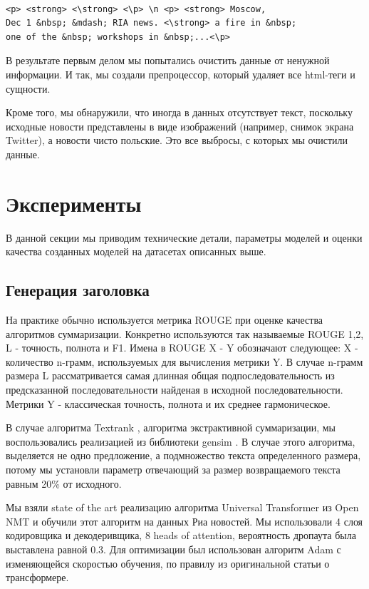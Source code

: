 \documentclass[14pt]{matmex-diploma-custom}
\begin{document}
\begin{verbatim}

<p> <strong> <\strong> <\p> \n <p> <strong> Moscow,
Dec 1 &nbsp; &mdash; RIA news. <\strong> a fire in &nbsp;
one of the &nbsp; workshops in &nbsp;...<\p>
\end{verbatim}

В результате первым делом мы попытались очистить данные от ненужной информации. И так, мы создали препроцессор, который удаляет все html-теги и сущности.

Кроме того, мы обнаружили, что иногда в данных отсутствует текст, поскольку исходные новости представлены в виде изображений (например, снимок экрана Twitter), а новости чисто польские. Это все выбросы, с которых мы очистили данные.


\section{Эксперименты}
В данной секции мы приводим технические детали, параметры моделей и оценки качества созданных моделей на датасетах описанных выше.

\subsection{Генерация заголовка}
На практике обычно используется метрика ROUGE \cite{Lin:2004} при оценке качества алгоритмов суммаризации. Конкретно используются так называемые ROUGE 1,2, L - точность, полнота и F1. Имена в ROUGE X - Y обозначают следующее: X - количество n-грамм, используемых для вычисления метрики Y. В случае n-грамм размера L рассматривается самая длинная общая подпоследовательность из предсказанной последовательности найденая в исходной последовательности. Метрики Y - классическая точность, полнота и их среднее гармоническое.

В случае алгоритма Textrank \cite{DBLP:journals/corr/BarriosLAW16}, алгоритма экстрактивной суммаризации, мы воспользовались реализацией из библиотеки gensim \cite{rehurek_lrec}. В случае этого алгоритма, выделяется не одно предложение, а подмножество текста определенного размера, потому мы установли параметр отвечающий за размер возвращаемого текста равным 20\% от исходного.

Мы взяли state of the art реализацию алгоритма Universal Transformer из Open NMT \cite{2017opennmt} и обучили этот алгоритм на данных Риа новостей. Мы использовали 4 слоя кодировщика и декодеривщика, 8 heads of attention, вероятность дропаута была выставлена равной 0.3. Для оптимизации был использован алгоритм Adam с изменяющейся скоростью обучения, по правилу из оригинальной статьи о трансформере.
\end{document}
